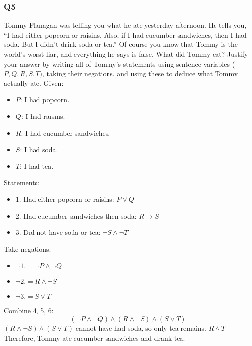 \documentclass{article}
\begin{document}
\subsubsection{Q5}
 Tommy Flanagan was telling you what he ate yesterday afternoon. He tells you, “I had either popcorn or raisins. Also, if I had cucumber sandwiches, then I had soda. But I didn’t drink soda or tea.” Of course you know that Tommy is the world's worst liar, and everything he says is false. What did Tommy eat? Justify your answer by writing all of Tommy’s statements using sentence variables ($P, Q, R, S, T$), taking their negations, and using these to deduce what Tommy actually ate.
    Given:
    \begin{itemize}
        \item $P$: I had popcorn.
        \item $Q$: I had raisins.
        \item $R$: I had cucumber sandwiches.
        \item $S$: I had soda.
        \item $T$: I had tea.
    \end{itemize}
    Statements:
    \begin{itemize}
        \item 1. Had either popcorn or raisins: $P \lor Q$
        \item 2. Had cucumber sandwiches then soda: $R \rightarrow S$
        \item 3. Did not have soda or tea: $\neg S \land \neg T$
    \end{itemize}
    Take negations:
    \begin{itemize}
        \item $\neg 1. = \neg P \land \neg Q$
        \item $\neg 2. = R \land \neg S$
        \item $\neg 3. = S \lor T$
    \end{itemize}
    Combine 4, 5, 6:
    \[
    (\neg P \land \neg Q) \land (R \land \neg S) \land (S \lor T)
    \]
    $(R \land \neg S) \land (S \lor T)$ cannot have had soda, so only tea remains.
    $R \land T$
     Therefore, Tommy ate cucumber sandwiches and drank tea.
\end{document}
